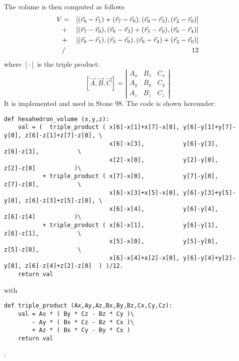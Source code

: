 The volume is then computed as follows
\begin{eqnarray}
V &=& [(\vec{r}_6-\vec{r}_1)+(\vec{r}_7-\vec{r}_0),(\vec{r}_6-\vec{r}_3),(\vec{r}_2-\vec{r}_0)] \nonumber\\
  &+& [(\vec{r}_7-\vec{r}_0),(\vec{r}_6-\vec{r}_3)+(\vec{r}_5-\vec{r}_0),(\vec{r}_6-\vec{r}_4)] \nonumber\\
  &+& [(\vec{r}_6-\vec{r}_1),(\vec{r}_5-\vec{r}_0),(\vec{r}_6-\vec{r}_4)+(\vec{r}_2-\vec{r}_0)] \nonumber\\
  &/& 12
\end{eqnarray}
where $[\cdot]$ is the triple product:
\[
[\vec{A},\vec{B},\vec{C}] = 
\left|
\begin{array}{ccc}
A_x & B_x & C_x \\
A_y & B_y & C_y \\
A_z & B_z & C_z 
\end{array}
\right|
\]
It is implemented and used in Stone 98. The code is shown hereunder:
\begin{lstlisting}
def hexahedron_volume (x,y,z):
    val = (  triple_product ( x[6]-x[1]+x[7]-x[0], y[6]-y[1]+y[7]-y[0], z[6]-z[1]+z[7]-z[0], \
                              x[6]-x[3],           y[6]-y[3],           z[6]-z[3],           \
                              x[2]-x[0],           y[2]-y[0],           z[2]-z[0]           )\
           + triple_product ( x[7]-x[0],           y[7]-y[0],           z[7]-z[0],           \
                              x[6]-x[3]+x[5]-x[0], y[6]-y[3]+y[5]-y[0], z[6]-z[3]+z[5]-z[0], \
                              x[6]-x[4],           y[6]-y[4],           z[6]-z[4]           )\
           + triple_product ( x[6]-x[1],           y[6]-y[1],           z[6]-z[1],           \
                              x[5]-x[0],           y[5]-y[0],           z[5]-z[0],           \
                              x[6]-x[4]+x[2]-x[0], y[6]-y[4]+y[2]-y[0], z[6]-z[4]+z[2]-z[0]  ) )/12.
    return val
\end{lstlisting}
with 
\begin{lstlisting}
def triple_product (Ax,Ay,Az,Bx,By,Bz,Cx,Cy,Cz):
    val = Ax * ( By * Cz - Bz * Cy )\
        - Ay * ( Bx * Cz - Bz * Cx )\
        + Az * ( Bx * Cy - By * Cx )
    return val
\end{lstlisting}

\Literature: \cite{duko88}

